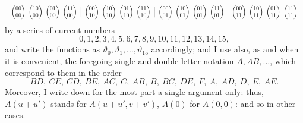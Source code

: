 \documentclass[11pt]{article}
\begin{document}
\[
\resizebox{\textwidth}{!}{$\displaystyle \begin{pmatrix} 00 \\ 00 \end{pmatrix}\ \begin{pmatrix} 10 \\ 00 \end{pmatrix}\ \begin{pmatrix} 01 \\ 00 \end{pmatrix}\ \begin{pmatrix} 11 \\ 00 \end{pmatrix}\ \Big|\ \begin{pmatrix} 00 \\ 10 \end{pmatrix}\ \begin{pmatrix} 10 \\ 10 \end{pmatrix}\ \begin{pmatrix} 01 \\ 10 \end{pmatrix}\ \begin{pmatrix} 11 \\ 10 \end{pmatrix}\ \Big|\ \begin{pmatrix} 00 \\ 01 \end{pmatrix}\ \begin{pmatrix} 10 \\ 01 \end{pmatrix}\ \begin{pmatrix} 01 \\ 01 \end{pmatrix}\ \begin{pmatrix} 11 \\ 01 \end{pmatrix}\ \Big|\ \begin{pmatrix} 00 \\ 11 \end{pmatrix}\ \begin{pmatrix} 10 \\ 11 \end{pmatrix}\ \begin{pmatrix} 01 \\ 11 \end{pmatrix}\ \begin{pmatrix} 11 \\ 11 \end{pmatrix}$}
\]
by a series of current numbers
\[
0,1,2,3,4,5,6,7,8,9,10,11,12,13,14,15,
\]
and write the functions as $\vartheta_0,\vartheta_1,\ldots,\vartheta_{15}$ accordingly; and I use also, as and when it is convenient, the foregoing single and double letter notation $A, AB,\ldots$, which correspond to them in the order
\[
BD,\ CE,\ CD,\ BE,\ AC,\ C,\ AB,\ B,\ BC,\ DE,\ F,\ A,\ AD,\ D,\ E,\ AE.
\]
Moreover, I write down for the most part a single argument only: thus, $A(u + u')$ stands for $A(u + u', v + v')$, $A(0)$ for $A(0,0)$: and so in other cases.
\end{document}
